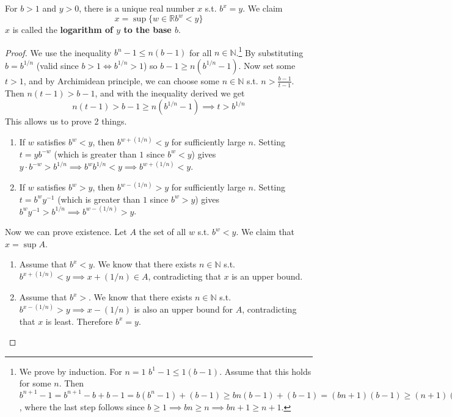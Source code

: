     \begin{theorem}[Logarithm]
      For $b > 1$ and $y > 0$, there is a unique real number $x$ s.t. $b^x = y$. We claim 
      \begin{equation}
        x = \sup\{ w \in \mathbb{R} b^w < y \}
      \end{equation}
      $x$ is called the \textbf{logarithm of $y$ to the base $b$}. 
    \end{theorem}
    \begin{proof}
      We use the inequality $b^n - 1 \leq n (b-1)$ for all $n \in \mathbb{N}$.\footnote{We prove by induction. For $n=1$ $b^1 - 1 \leq 1 (b-1)$. Assume that this holds for some $n$. Then $b^{n+1} - 1 = b^{n+1} - b + b - 1 = b (b^n - 1) + (b-1) \geq bn (b-1) + (b-1) = (bn + 1) (b-1) \geq (n+1) (b-1)$, where the last step follows since $b \geq 1 \implies bn \geq n \implies bn + 1 \geq n + 1$. } By substituting $b = b^{1/n}$ (valid since $b > 1 \iff b^{1/n} > 1$) so $b-1 \geq n(b^{1/n} - 1)$. Now set some $t > 1$, and by Archimidean principle, we can choose some $n \in \mathbb{N}$ s.t. $n > \frac{b-1}{t-1}$. Then $n (t-1) > b-1$, and with the inequality derived we get 
      \begin{equation}
        n (t - 1) > b - 1 \geq n (b^{1/n} - 1) \implies t > b^{1/n}
      \end{equation} 
      This allows us to prove 2 things. 
      \begin{enumerate}
        \item If $w$ satisfies $b^w < y$, then $b^{w + (1/n)} < y$ for sufficiently large $n$. Setting $t = y b^{-w}$ (which is greater than $1$ since $b^w < y$) gives $y \cdot b^{-w} > b^{1/n} \implies b^w b^{1/n} < y \implies b^{w + (1/n)} < y$. 
        \item If $w$ satisfies $b^w > y$, then $b^{w - (1/n)} > y$ for sufficiently large $n$. Setting $t = b^w y^{-1}$ (which is greater than $1$ since $b^w > y$) gives $b^w y^{-1} > b^{1/n} \implies b^{w - (1/n)} > y$. 
      \end{enumerate}
      Now we can prove existence. Let $A$ the set of all $w$ s.t. $b^w < y$. We claim that $x = \sup{A}$. 
      \begin{enumerate}
        \item Assume that $b^x < y$. We know that there exists $n \in \mathbb{N}$ s.t. $b^{x + (1/n)} < y \implies x + (1/n) \in A$, contradicting that $x$ is an upper bound. 
        \item Assume that $b^x > $. We know that there exists $n \in \mathbb{N}$ s.t. $b^{x - (1/n)} > y \implies x - (1/n)$ is also an upper bound for $A$, contradicting that $x$ is least. Therefore $b^x = y$. 

\end{enumerate}
\end{proof}
